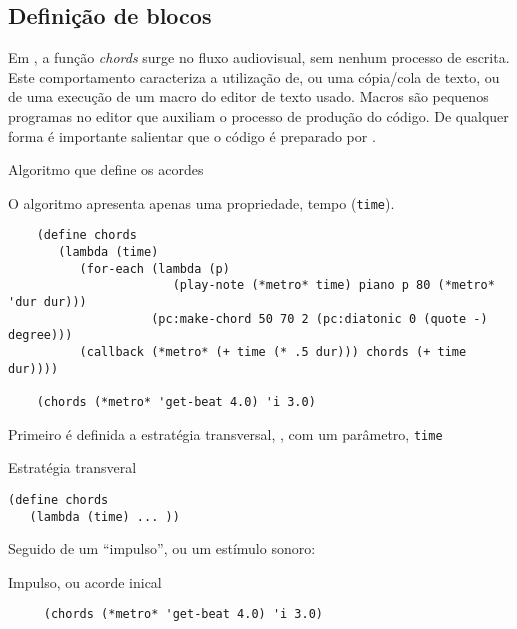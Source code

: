 \subsection {Definição de blocos}\label{sec:define_chords}

Em , a função \emph{chords} surge no fluxo audiovisual, sem nenhum processo de escrita. Este comportamento caracteriza a utilização de, ou uma cópia/cola de texto, ou de uma execução de um macro do editor de texto usado. Macros são pequenos programas no editor que auxiliam o processo de produção do código. De qualquer forma é importante salientar que o código é preparado por .

\begin{example}{Algoritmo que define os acordes}

O algoritmo apresenta apenas uma propriedade, tempo (\verb|time|).

\begin{verbatim}
    (define chords
       (lambda (time)
          (for-each (lambda (p)
                       (play-note (*metro* time) piano p 80 (*metro* 'dur dur)))                                 
                    (pc:make-chord 50 70 2 (pc:diatonic 0 (quote -) degree)))
          (callback (*metro* (+ time (* .5 dur))) chords (+ time dur))))

    (chords (*metro* 'get-beat 4.0) 'i 3.0)
\end{verbatim}
\end{example}

Primeiro é definida a estratégia transversal, , com um parâmetro, \verb|time|

\begin{example}{Estratégia transveral}
\begin{verbatim}
(define chords
   (lambda (time) ... ))
\end{verbatim}
\end{example}

Seguido de um ``impulso'', ou um estímulo sonoro:

\begin{example}{Impulso, ou acorde inical}
\begin{verbatim}
     (chords (*metro* 'get-beat 4.0) 'i 3.0)
\end{verbatim}
\end{example}

